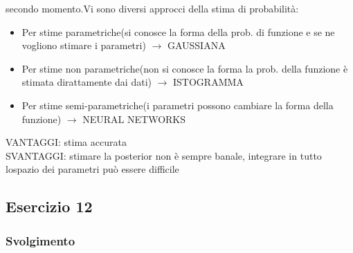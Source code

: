 \documentclass{article}
\begin{document}
secondo momento.Vi sono diversi approcci della stima di probabilità:
\begin{itemize}
    \item Per stime parametriche(si conosce la forma della prob. di funzione e se ne vogliono stimare i parametri) $\rightarrow$ GAUSSIANA
    \item Per stime non parametriche(non si conosce la forma la prob. della funzione è stimata dirattamente dai dati) $\rightarrow$ ISTOGRAMMA
    \item Per stime semi-parametriche(i parametri possono cambiare la forma della funzione) $\rightarrow$ NEURAL NETWORKS
\end{itemize}
VANTAGGI: stima accurata\\
SVANTAGGI: stimare la posterior non è sempre banale, integrare in tutto lospazio dei parametri può essere difficile
\subsection*{Esercizio 12}

\subsubsection*{Svolgimento}
\end{document}
